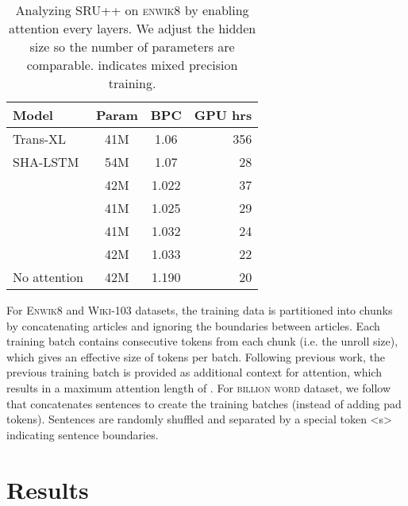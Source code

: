 \documentclass[11pt,a4paper]{article}
\begin{document}
\begin{table}[!t]
    \centering
    \begin{tabular}{lccr}
    \toprule
    \bf Model & \bf Param & \bf BPC  & \bf GPU hrs\\
    \hline
    Trans-XL & 41M & 1.06 & 356\\
    SHA-LSTM & 54M & 1.07 & 28\\
    \hline
     & 42M & 1.022 & 37\\
     & 41M & 1.025 & 29\\
     & 41M & 1.032 & 24\\
     & 42M & 1.033 & 22\\
    No attention & 42M & 1.190 & 20\\
    \bottomrule
    \end{tabular}
    \caption{Analyzing SRU++ on \textsc{enwik8} by enabling attention every  layers. We adjust the hidden size so the number of parameters are comparable.  indicates mixed precision training.}
    \label{table:analyze_attention}
\end{table}

For \textsc{Enwik8} and \textsc{Wiki-103} datasets, the training data is partitioned into  chunks by concatenating articles and ignoring the boundaries between articles.
Each training batch contains  consecutive tokens from each chunk (i.e. the unroll size), which gives an effective size of  tokens per batch.
Following previous work, the previous training batch is provided as additional context for attention, which results in a maximum attention length of .
For \textsc{billion word} dataset, we follow~\citep{dai-etal-2019-transformer} that concatenates sentences to create the training batches (instead of adding pad tokens).
Sentences are randomly shuffled and separated by a special token <s> indicating sentence boundaries.

\section{Results}
\label{sec:results}
\end{document}
